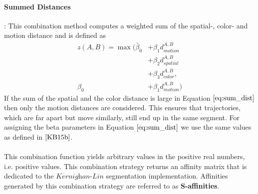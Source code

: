 \paragraph{Summed Distances}: This combination method computes a weighted sum of the spatial-, color- and motion distance and is defined as
\begin{equation}
\begin{aligned}
z ( A, B ) = \max (\tilde{\beta_0} & + \beta_1 d_{motion}^{A,B} \\
& + \beta_2 d_{spatial}^{A,B} \\
& + \beta_3 d_{color}^{A,B},\\
\beta_0 & + \beta_1 d_{motion}^{A,B} )
\end{aligned}
\label{eq:sum_dist}
\end{equation}
If the sum of the spatial and the color distance is large in Equation $\ref{eq:sum_dist}$ then only the motion distances are considered. This ensures that trajectories, which are far apart but move similarly, still end up in the same segment. For assigning the beta parameters in Equation $\ref{eq:sum_dist}$ we use the same values as defined in $\cite{KB15b}$.\\ \\
This combination function yields arbitrary values in the positive real numbers, i.e. positive values. This combination strategy returns an affinity matrix that is dedicated to the $\textit{Kernighan-Lin}$ segmentation implementation. Affinities generated by this combination strategy are referred to as \textbf{S-affinities}.
 
